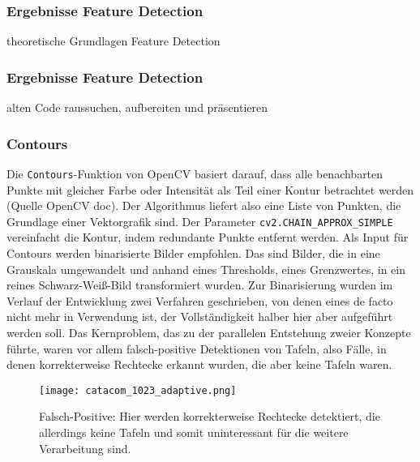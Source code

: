 \subsubsection{Ergebnisse Feature Detection}

theoretische Grundlagen Feature Detection\\

\subsubsection{Ergebnisse Feature Detection}

alten Code raussuchen, aufbereiten und präsentieren\\

\subsubsection{Contours}

Die \verb|Contours|-Funktion von OpenCV basiert darauf, dass alle benachbarten Punkte mit gleicher Farbe oder Intensität als Teil einer Kontur betrachtet werden (Quelle OpenCV doc). Der Algorithmus liefert also eine Liste von Punkten, die Grundlage einer Vektorgrafik sind. Der Parameter \verb|cv2.CHAIN_APPROX_SIMPLE| vereinfacht die Kontur, indem redundante Punkte entfernt werden. Als Input für Contours werden binarisierte Bilder empfohlen. Das sind Bilder, die in eine Grauskala umgewandelt  und anhand eines Thresholds, eines Grenzwertes, in ein reines Schwarz-Weiß-Bild transformiert wurden. Zur Binarisierung wurden im Verlauf der Entwicklung zwei Verfahren geschrieben, von denen eines de facto nicht mehr in Verwendung ist, der Vollständigkeit halber hier aber aufgeführt werden soll.
Das Kernproblem, das zu der parallelen Entstehung zweier Konzepte führte, waren vor allem falsch-positive Detektionen von Tafeln, also Fälle, in denen korrekterweise Rechtecke erkannt wurden, die aber keine Tafeln waren.
\begin{SCfigure}[1][h!]
\caption{Falsch-Positive: Hier werden korrekterweise Rechtecke detektiert, die allerdings keine Tafeln und somit uninteressant für die weitere Verarbeitung sind.}
\texttt{[image: catacom\_1023\_adaptive.png]}
\end{SCfigure}

